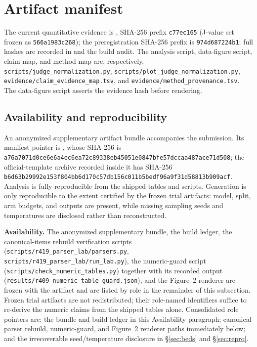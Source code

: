 \documentclass{article}
\begin{document}
\section{Artifact manifest}\label{sec:appx_artifact}
\label{app:artifact-manifest}

The current quantitative evidence is
, SHA-256 prefix
\texttt{c77ec165} (J-value set frozen as \texttt{566a1983c268}); the
preregistration SHA-256 prefix is \texttt{974d687224b1}; full hashes are
recorded in  and the build audit.
The analysis script, data-figure script, claim map, and method map are,
respectively, \texttt{scripts/judge\_normalization.py},
\texttt{scripts/plot\_judge\_normalization.py},
\texttt{evidence/claim\_evidence\_map.tsv}, and
\texttt{evidence/method\_provenance.tsv}.  The data-figure script asserts the
evidence hash before rendering.

\subsection{Availability and reproducibility}
\label{sec:appx_repro}

{\raggedright
An anonymized supplementary artifact bundle accompanies the submission.  Its
manifest pointer is , whose SHA-256 is
\texttt{a76a7071d0ce6e6a4ec6ea72c89338eb45051e0847bfe57dccaa487ace71d508};
the official-template archive recorded inside it has SHA-256
\texttt{b6d63b29992e153f804bb6d170c57db156c011b5bedf96a9f31d58813b909acf}.
Analysis is fully reproducible from the shipped tables and scripts.  Generation
is only reproducible to the extent certified by the frozen trial artifacts:
model, split, arm budgets, and outputs are present, while missing sampling seeds
and temperatures are disclosed rather than reconstructed.\par}

{\raggedright
\textbf{Availability.} The anonymized supplementary bundle, the build ledger,
the canonical-items rebuild verification scripts
(\texttt{scripts/r419\_parser\_lab/parsers.py},
\texttt{scripts/r419\_parser\_lab/run\_lab.py}), the numeric-guard script
(\texttt{scripts/check\_numeric\_tables.py}) together with its recorded output
(\texttt{results/r409\_numeric\_table\_guard.json}), and the Figure~2 renderer
are frozen with the artifact and are listed by role in the remainder of this
subsection.  Frozen trial artifacts are not redistributed;
their role-named identifiers suffice to re-derive the numeric claims from the
shipped tables alone.  Consolidated role pointers are: the bundle and build
ledger in this Availability paragraph; canonical parser rebuild, numeric-guard,
and Figure~2 renderer paths immediately below; and the irrecoverable
seed/temperature disclosure in \S\ref{sec:beds} and \S\ref{sec:repro}.\par}
\end{document}
